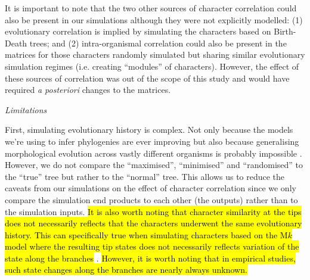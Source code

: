 \documentclass[12pt,letterpaper]{article}
\renewcommand{\subsection}[1]{%
\bigskip
\begin{center}
\begin{large}
\normalfont\itshape #1
\end{large}
\end{center}}
\begin{document}
It is important to note that the two other sources of character correlation could also be present in our simulations although they were not explicitly modelled:
(1) evolutionary correlation is implied by simulating the characters based on Birth-Death trees;
and (2) intra-organismal correlation could also be present in the matrices for those characters randomly simulated but sharing similar evolutionary simulation regimes (i.e. creating ``modules'' of characters).
However, the effect of these sources of correlation was out of the scope of this study and would have required \textit{a posteriori} changes to the matrices.%

\subsection{Limitations}
First, simulating evolutionary history is complex.
Not only because the models we're using to infer phylogenies are ever improving \citep[e.g.][]{heath2014fossilized,Wright01072016} but also because generalising morphological evolution across vastly different organisms is probably impossible \citep[see constrasted discussions from][]{GoloboffEmpirical,OReillyEmpirical}.
However, we do not compare the ``maximised'', ``minimised'' and ``randomised'' to the ``true'' tree but rather to the ``normal'' tree.
This allows us to reduce the caveats from our simulations on the effect of character correlation since we only compare the simulation end products to each other (the outputs) rather than to the simulation inputs.
\hl{It is also worth noting that character similarity at the tips does not necessarily reflects that the characters underwent the same evolutionary history.
This can specifically true when simulating characters based on the M$k$ model where the resulting tip states does not necessarily reflects variation of the state along the branches}
 \citep[e.g.][]{revell2014ancestral}.
\hl{However, it is worth noting that in empirical studies, such state changes along the branches are nearly always unknown.}
\end{document}
